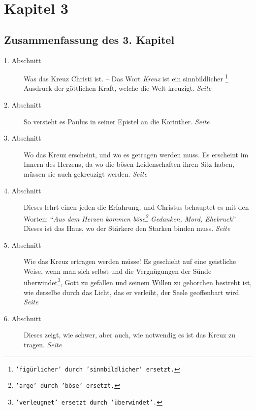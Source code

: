 

\chapter{Kapitel 3} \label{kap3}

\section{Zusammenfassung des 3. Kapitel}


\begin{description}
\item[1. Abschnitt] Was das Kreuz Christi ist. -- Das Wort \textit{Kreuz} ist
ein
sinnbildlicher
\footnote{\texttt{'figürlicher' durch 'sinnbildlicher' ersetzt.}}
Ausdruck der göttlichen Kraft, welche die Welt kreuzigt.
\dotfill \textit{Seite~\pageref{kap3_ab1}}\\
\item[2. Abschnitt] So versteht es Paulus in seiner Epistel an die
Korinther.
\dotfill \textit{Seite~\pageref{kap3_ab2}}\\
\item[3. Abschnitt] Wo das Kreuz erscheint, und wo es getragen werden muss. Es
erscheint im Innern des Herzens, da wo die bösen Leidenschaften ihren Sitz
haben,
müssen sie auch gekreuzigt werden.
\dotfill \textit{Seite~\pageref{kap3_ab3}}\\
\item[4. Abschnitt] Dieses lehrt einen jeden
die Erfahrung, und Christus
behauptet es mit den Worten: "`\textit{Aus dem Herzen kommen
böse\footnote{\texttt{'arge' durch 'böse' ersetzt.}} Gedanken, Mord,
Ehebruch}"' Dieses ist das Haus, wo der Stärkere den Starken binden muss.
\dotfill \textit{Seite~\pageref{kap3_ab4}}\\
\item[5. Abschnitt] Wie das Kreuz ertragen werden müsse! Es geschieht auf eine
geistliche Weise, wenn man sich selbst und die Vergnügungen der Sünde
überwindet\footnote{\texttt{'verleugnet' ersetzt durch 'überwindet'.}}, Gott zu
gefallen und
seinem Willen zu gehorchen bestrebt ist, wie
derselbe durch das Licht, das er verleiht, der Seele geoffenbart wird.
\dotfill \textit{Seite~\pageref{kap3_ab5}}\\
\item[6. Abschnitt] Dieses zeigt, wie schwer, aber auch, wie notwendig es ist
das Kreuz zu tragen.
\dotfill \textit{Seite~\pageref{kap3_ab6}}\\
\end{description}

